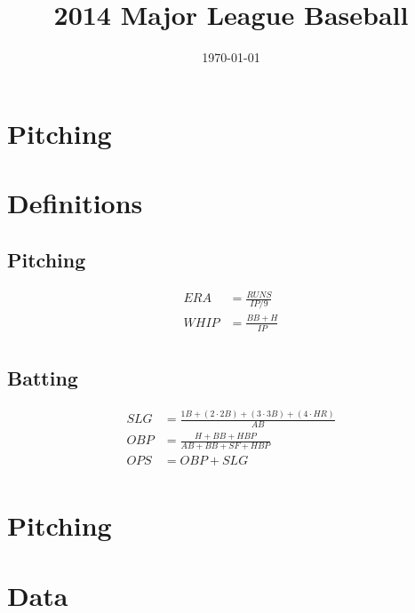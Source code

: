 \documentclass[landscape]{article}
\author{}
\title{2014 Major League Baseball}
\date{\today}
\begin{document}
  \maketitle

  \section{Pitching} %
  
  \section{Definitions} %

  \subsection{Pitching} %
  
  \begin{align*}
    ERA  & = \frac{RUNS}{IP/9} \\
    WHIP & = \frac{BB + H}{IP} \\
  \end{align*}

  \subsection{Batting} %
  \begin{align*}
    SLG &= \frac{1B + (2 \cdot 2B) + (3 \cdot 3B) + (4 \cdot HR)}{AB} \\
    OBP &= \frac{H + BB + HBP}{AB + BB + SF + HBP} \\
    OPS &= OBP + SLG \\
  \end{align*}

  \section{Pitching} %
  
  \section{Data} %
  
\end{document}
